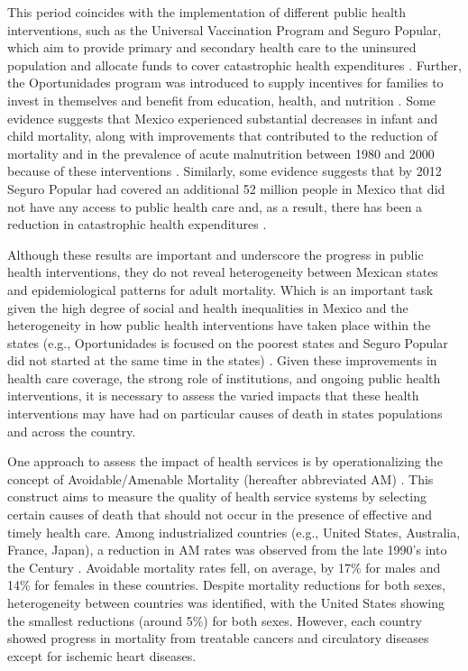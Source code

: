 \documentclass{article}
\begin{document}
This
period coincides with the implementation of different public health
interventions, such as the Universal Vaccination Program and Seguro
Popular, which aim to provide primary and secondary
health care to the uninsured population and allocate funds to cover catastrophic
health expenditures \citep{knaul2005}. Further, the Oportunidades program
was introduced to supply incentives for families to invest in themselves and
benefit from education, health, and nutrition \citep{neufeld2012}. Some evidence
suggests that Mexico experienced substantial decreases in infant and child
mortality, along with improvements that contributed to the reduction of
mortality and in the prevalence of acute malnutrition between 1980 and 2000
because of these interventions \citep{sepulveda2006}. Similarly, some evidence
suggests that by 2012 Seguro Popular had covered an additional 52 million
people in Mexico that did not have any access to public health care and, as a result, there has been a reduction in catastrophic health expenditures \citep{knaul2012}.

 Although these results are important and underscore the progress in public health interventions,  they do not reveal heterogeneity between
 Mexican states and epidemiological patterns for adult mortality. Which is an important task given the high degree of social and
 health inequalities in Mexico and the heterogeneity in how public health interventions have taken place within the states (e.g., Oportunidades is focused on the poorest states and Seguro Popular did not started at the same time in the states) \citep{Frenk2006}.  Given these improvements
 in health care coverage, the strong role of institutions, and ongoing public
 health interventions, it is necessary to assess the varied impacts that
 these health interventions may have had on particular causes of death in states
 populations and across the country.
 
 One approach to assess the impact of health services is by operationalizing the
 concept of Avoidable/Amenable Mortality (hereafter abbreviated AM)
 \citep{nolte&mckee2004, nolte&mckee2008}. This construct aims to measure the quality of health service systems by selecting certain
 causes of death that should not occur in the presence of effective and
 timely health care. Among industrialized countries (e.g., United States,
 Australia, France, Japan), a reduction in AM rates was
 observed from the late 1990's into the  Century
 \citep{nolte&mckee2008}. Avoidable mortality rates fell, on average, by 17\%
 for males and 14\% for females in these countries. Despite mortality reductions for
 both sexes, heterogeneity between countries was identified, with the United
 States showing the smallest reductions (around 5\%) for both sexes. However,
 each country showed progress in mortality from treatable cancers and
 circulatory diseases except for ischemic heart diseases.
\end{document}
